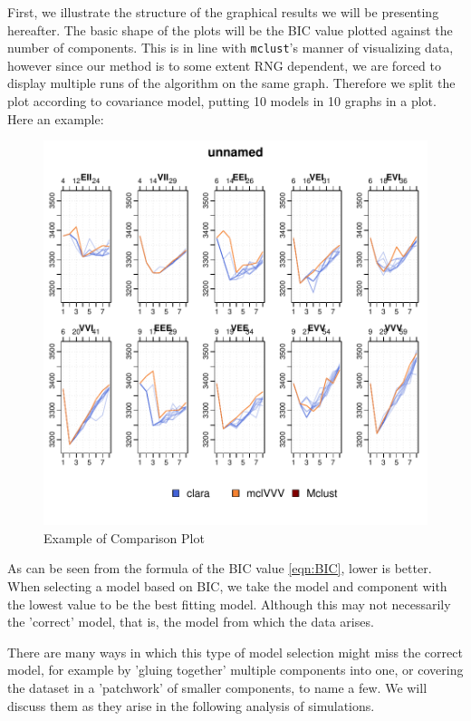 First, we illustrate the structure of the graphical results we will be 
presenting hereafter. The basic shape of the plots will be the BIC value 
plotted against the number of components. This is in line with {\tt mclust}'s
manner of visualizing data, however since our method is to some extent RNG 
dependent, we are forced to display multiple runs of the algorithm on the same
graph. Therefore we split the plot according to covariance model, putting 10
models in 10 graphs in a plot. Here an example:


\begin{figure}[h!]
    \begin{Rgraph}[0.9]
\includegraphics{chapter3-bicplotdemoplot}
    \caption{Example of Comparison Plot}
    \label{fig:ExPlot}
    \end{Rgraph}
\end{figure}

As can be seen from the formula of the BIC value \ref{eqn:BIC}, lower is better.
When selecting a model based on BIC, we take the model and component with the 
lowest value to be the best fitting model. Although this may not necessarily
the 'correct' model, that is, the model from which the data arises.

There are many ways in which this type of model selection might miss the 
correct model, for example by 'gluing together' multiple components into one,
or covering the dataset in a 'patchwork' of smaller components, to name a few.
We will discuss them as they arise in the following analysis of simulations.

